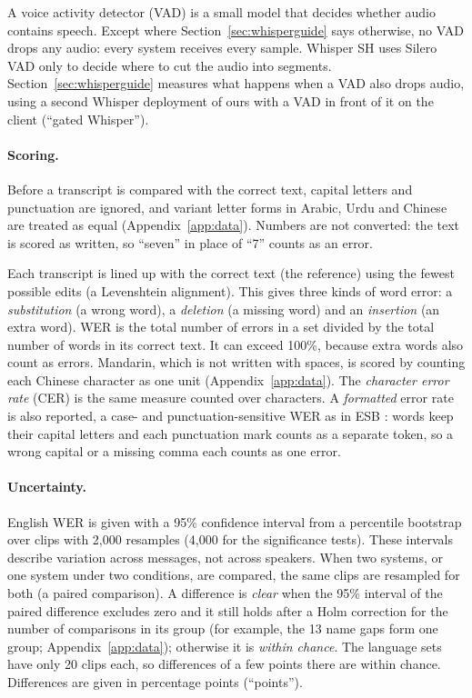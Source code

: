 \documentclass[11pt]{article}
\begin{document}
A voice activity detector (VAD) is a small model that decides whether audio contains speech. Except where Section~\ref{sec:whisperguide} says otherwise, no VAD drops any audio: every system receives every sample. Whisper SH uses Silero VAD \citep{silero} only to decide where to cut the audio into segments. Section~\ref{sec:whisperguide} measures what happens when a VAD also drops audio, using a second Whisper deployment of ours with a VAD in front of it on the client (``gated Whisper'').

\paragraph{Scoring.} Before a transcript is compared with the correct text, capital letters and punctuation are ignored, and variant letter forms in Arabic, Urdu and Chinese are treated as equal (Appendix~\ref{app:data}). Numbers are not converted: the text is scored as written, so ``seven'' in place of ``7'' counts as an error.

Each transcript is lined up with the correct text (the reference) using the fewest possible edits (a Levenshtein alignment). This gives three kinds of word error: a \emph{substitution} (a wrong word), a \emph{deletion} (a missing word) and an \emph{insertion} (an extra word). WER is the total number of errors in a set divided by the total number of words in its correct text. It can exceed 100\%, because extra words also count as errors. Mandarin, which is not written with spaces, is scored by counting each Chinese character as one unit (Appendix~\ref{app:data}). The \emph{character error rate} (CER) is the same measure counted over characters. A \emph{formatted} error rate is also reported, a case- and punctuation-sensitive WER as in ESB \citep{gandhi2022esb}: words keep their capital letters and each punctuation mark counts as a separate token, so a wrong capital or a missing comma each counts as one error.

\paragraph{Uncertainty.} English WER is given with a 95\% confidence interval from a percentile bootstrap over clips with 2{,}000 resamples \citep{bisani2004bootstrap} (4{,}000 for the significance tests). These intervals describe variation across messages, not across speakers. When two systems, or one system under two conditions, are compared, the same clips are resampled for both (a paired comparison). A difference is \emph{clear} when the 95\% interval of the paired difference excludes zero and it still holds after a Holm correction for the number of comparisons in its group (for example, the 13 name gaps form one group; Appendix~\ref{app:data}); otherwise it is \emph{within chance}. The language sets have only 20 clips each, so differences of a few points there are within chance. Differences are given in percentage points (``points'').
\end{document}
